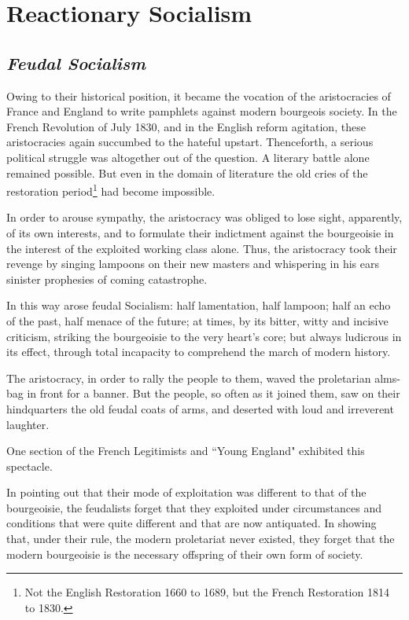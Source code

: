 \section{Reactionary Socialism}

\subsection{\itshape Feudal Socialism}

Owing to their historical position, it became the vocation of the aristocracies of France and England to write pamphlets against modern bourgeois society. In the French Revolution of July 1830, and in the English reform agitation, these aristocracies again succumbed to the hateful upstart. Thenceforth, a serious political struggle was altogether out of the question. A literary battle alone remained possible. But even in the domain of literature the old cries of the restoration period\footnote{Not the English Restoration 1660 to 1689, but the French Restoration 1814 to 1830.} had become impossible.

In order to arouse sympathy, the aristocracy was obliged to lose sight, apparently, of its own interests, and to formulate their indictment against the bourgeoisie in the interest of the exploited working class alone. Thus, the aristocracy took their revenge by singing lampoons on their new masters and whispering in his ears sinister prophesies of coming catastrophe. 

In this way arose feudal Socialism: half lamentation, half lampoon; half an echo of the past, half menace of the future; at times, by its bitter, witty and incisive criticism, striking the bourgeoisie to the very heart’s core; but always ludicrous in its effect, through total incapacity to comprehend the march of modern history. 

The aristocracy, in order to rally the people to them, waved the proletarian alms-bag in front for a banner. But the people, so often as it joined them, saw on their hindquarters the old feudal coats of arms, and deserted with loud and irreverent laughter. 

One section of the French Legitimists and ``Young England" exhibited this spectacle. 

In pointing out that their mode of exploitation was different to that of the bourgeoisie, the feudalists forget that they exploited under circumstances and conditions that were quite different and that are now antiquated. In showing that, under their rule, the modern proletariat never existed, they forget that the modern bourgeoisie is the necessary offspring of their own form of society. 

